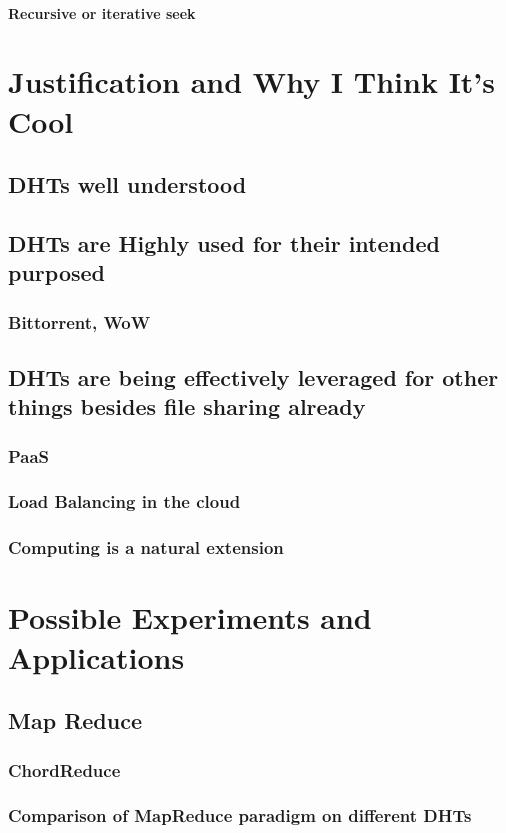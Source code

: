 \documentclass[10pt,letterpaper]{article}
\begin{document}
\paragraph{Recursive or iterative seek}
\section{Justification and Why I Think It's Cool}
\subsection{DHTs well understood}
\subsection{DHTs are Highly used for their intended purposed}
\subsubsection{Bittorrent, WoW}
\subsection{DHTs are being effectively leveraged for other things besides file sharing already}
\subsubsection{PaaS}
\subsubsection{Load Balancing in the cloud}
\subsubsection{Computing is a natural extension}

\section{Possible Experiments and Applications}

\subsection{Map Reduce}
\subsubsection{ChordReduce}
\subsubsection{Comparison of  MapReduce paradigm on different DHTs}
\end{document}
